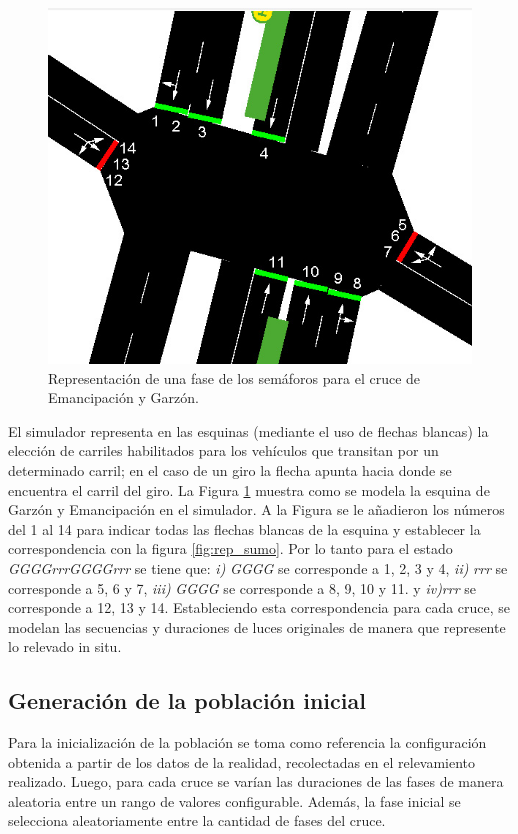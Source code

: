 \begin{figure}[H]
	\centering
	\includegraphics[width=0.7\linewidth]{Figures/semaforos_numerado}
	\caption[Representación de una fase de los semáforos para un cruce.]{Representación de una fase de los semáforos para el cruce de Emancipación y Garzón.}
	\label{fig:sem_numerados}
\end{figure}
El simulador representa en las esquinas (mediante el uso de flechas blancas) la elección de carriles habilitados para los vehículos que transitan por un determinado carril; en el caso de un giro la flecha apunta hacia donde se encuentra el carril del giro. La Figura \ref{fig:sem_numerados} muestra como se modela la esquina de Garzón y Emancipación en el simulador. A la Figura se le añadieron los números del 1 al 14 para indicar todas las flechas blancas de la esquina y establecer la correspondencia con la figura \ref{fig:rep_sumo}. Por lo tanto para el estado \emph{GGGGrrrGGGGrrr} se tiene que:
\textit{i)} \emph{GGGG} se corresponde a 1, 2, 3 y 4, \textit{ii)} \emph{rrr} se corresponde a 5, 6 y 7, \textit{iii)} \emph{GGGG} se corresponde a 8, 9, 10 y 11. y \textit{iv)}\emph{rrr} se corresponde a 12, 13 y 14. Estableciendo esta correspondencia para cada cruce, se modelan las secuencias y duraciones de luces originales de manera que represente lo relevado in situ.


\subsection{Generación de la población inicial}

Para la inicialización de la población se toma como referencia la configuración obtenida a partir de los datos de la realidad, recolectadas en el relevamiento realizado. Luego, para cada cruce se varían las duraciones de las fases de manera aleatoria entre un rango de valores configurable. Además, la fase inicial se selecciona aleatoriamente entre la cantidad de fases del cruce.

